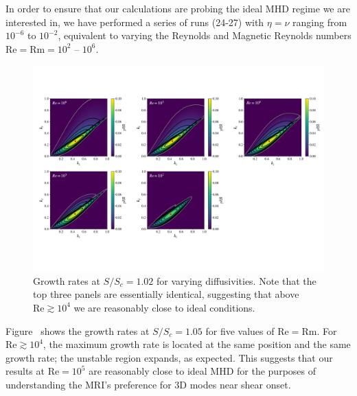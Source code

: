\documentclass{rsproca_new}%
\newcommand{\SSC}{S/S_{c}}
\newcommand{\Reyn}{\mathrm{Re}}
\newcommand{\Reym}{\mathrm{Rm}}
\begin{document}
In order to ensure that our calculations are probing the ideal MHD regime we are interested in, we have performed a series of runs (24-27) with $\eta = \nu$ ranging from $10^{-6}$ to $10^{-2}$, equivalent to varying the Reynolds and Magnetic Reynolds numbers $\Reyn = \Reym = 10^2$ -- $10^6$.
\begin{figure}[h!]
  \centering
  \includegraphics[width=\textwidth]{re_plots.pdf}
  \caption{Growth rates at $\SSC = 1.02$ for varying diffusivities. Note that the top three panels are essentially identical, suggesting that above $\Reyn \gtrsim 10^4$ we are reasonably close to ideal conditions.}
  \label{fig:reynolds}
\end{figure}
Figure~\pageref{fig:reynolds} shows the growth rates at $\SSC=1.05$ for five values of $\Reyn = \Reym$.
For $\Reyn \gtrsim 10^4$, the maximum growth rate is located at the same position and the same growth rate; the unstable region expands, as expected.
This suggests that our results at $\Reyn = 10^5$ are reasonably close to ideal MHD for the purposes of understanding the MRI's preference for 3D modes near shear onset.
\end{document}
